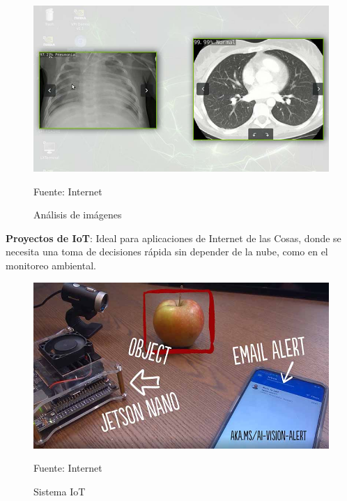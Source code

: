 \begin{figure}[H]
  \centering
  \includegraphics[scale = 0.5]{Imagenes/healthcare.jpg}
  \caption{Análisis de imágenes}{Fuente: Internet}
\end{figure}

\textbf{Proyectos de IoT}: Ideal para aplicaciones de Internet de las Cosas, donde se necesita una toma de decisiones rápida sin depender de la nube, como en el monitoreo ambiental.

\begin{figure}[H]
  \centering
  \includegraphics[scale = 0.5]{Imagenes/IoT.jpg}
  \caption{Sistema IoT}{Fuente: Internet}
\end{figure}